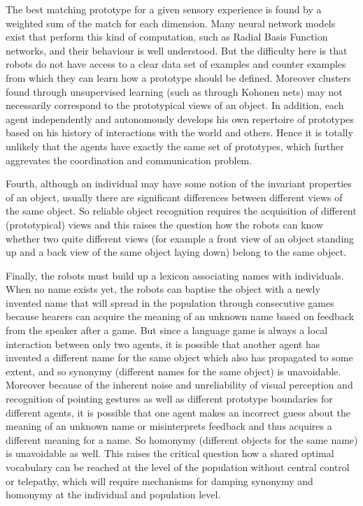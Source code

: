 The best matching prototype for a given sensory experience is  
found by a weighted sum of the match for each dimension. Many neural network models exist that perform this kind
of computation, such as Radial Basis Function networks, and their behaviour is well
understood. But the difficulty here is that robots do not have access
to a clear data set of examples and counter examples from which they
can learn how a prototype should be defined. Moreover clusters found
through unsupervised learning (such as through Kohonen
nets) may not necessarily correspond to the prototypical
views of an object. In addition, each agent independently and autonomously
develops his own repertoire of prototypes based on his history of
interactions with the world and others. Hence it is totally unlikely
that the agents have exactly the same set of prototypes, which
further aggrevates the coordination and communication problem. 

Fourth, although an individual may have some notion of the invariant properties
of an object, usually
there are significant differences between different views of the same
object. So reliable object recognition requires the acquisition of
different (prototypical) views and this raises the question how the
robots can know whether two quite different views (for example a front
view of an object standing up and a back view of the same object
laying down) belong to the same object. 

Finally, the robots must build up a lexicon associating names with individuals. When no name
exists yet, the robots can baptise the object with a newly invented name that
will spread in the population through consecutive games because
hearers can acquire the meaning of an unknown name based on feedback
from the speaker after a game. But since a language game is always a
local interaction between only two agents, it is possible that another
agent has invented a different name for the same object which also has
propagated to some extent, and so synonymy (different names for the
same object) is unavoidable. Moreover because of the inherent noise
and unreliability of visual perception and recognition of pointing
gestures as well as different prototype boundaries for different
agents, it is possible that one agent makes an incorrect guess about
the meaning of an unknown name or misinterprets feedback and thus
acquires a different meaning for a name. So homonymy (different
objects for the same name) is unavoidable as well. This raises the
critical question how a shared optimal vocabulary can be reached at
the level of the population without central control or telepathy,
which will require mechanisms for damping synonymy and homonymy at the
individual and population level.

